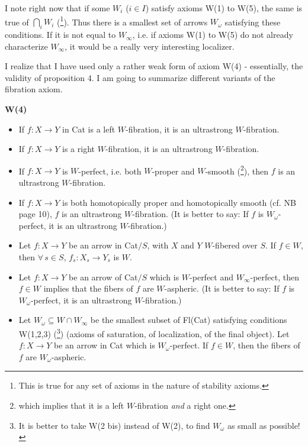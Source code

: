 I note right now that if some $W_i$ ($i \in I$) satisfy axioms W(1) to W(5), the same is true of $\bigcap_i W_i$ (\footnote[30]{This is true for any set of axioms in the nature of stability axioms.}). Thus there is a smallest set of arrows $W_\omega$ satisfying these conditions. If it is not equal to $W_\infty$, i.e. if axioms W(1) to W(5) do not already characterize $W_\infty$, it would be a really very interesting localizer.

I realize that I have used only a rather weak form of axiom W(4) - essentially, the validity of proposition 4. I am going to summarize different variants of the fibration axiom.

\textbf{W(4)}

\begin{itemize}[leftmargin=4em, labelwidth=2.5em, labelsep=0.6em, align=right]
\item[a$_1$)] If $f : X \longrightarrow Y$ in Cat is a left $W$-fibration, it is an ultrastrong $W$-fibration.

\item[a$_2$)] If $f : X \longrightarrow Y$ is a right $W$-fibration, it is an ultrastrong $W$-fibration.

\item[a$'$)] If $f : X \longrightarrow Y$ is $W$-perfect, i.e. both $W$-proper and $W$-smooth (\footnote[31]{which implies that it is a left $W$-fibration \textit{and} a right one.}), then $f$ is an ultrastrong $W$-fibration.

\item[a$''$)] If $f : X \longrightarrow Y$ is both homotopically proper and homotopically smooth (cf. NB page 10), $f$ is an ultrastrong $W$-fibration. (It is better to say: If $f$ is $W_\omega$-perfect, it is an ultrastrong $W$-fibration.)

\item[b)] Let $f : X \longrightarrow Y$ be an arrow in Cat$/S$, with $X$ and $Y$ $W$-fibered over $S$. If $f \in W$, then $\forall\, s \in S$, $f_s : X_s \longrightarrow Y_s$ is $W$.

\item[b$'$)] Let $f : X \longrightarrow Y$ be an arrow of Cat$/S$ which is $W$-perfect and $W_\infty$-perfect, then $f \in W$ implies that the fibers of $f$ are $W$-aspheric. (It is better to say: If $f$ is $W_\omega$-perfect, it is an ultrastrong $W$-fibration.) 

\item[b$''$)] Let $W_\omega \subseteq W \cap W_\infty$ be the smallest subset of Fl(Cat) satisfying conditions W(1,2,3) (\footnote[32]{It is better to take W(2 bis) instead of W(2), to find $W_\omega$ as small as possible!}) (axioms of saturation, of localization, of the final object). Let $f : X \longrightarrow Y$ be an arrow in Cat which is $W_\omega$-perfect. If $f \in W$, then the fibers of $f$ are $W_\omega$-aspheric.
\end{itemize}


